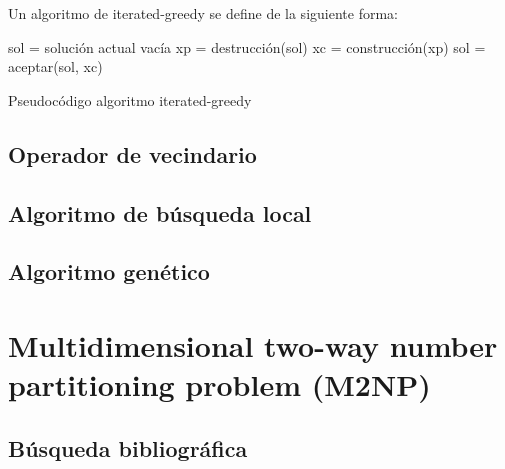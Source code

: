 \documentclass[13pt,a4paper]{article}
\begin{document}
Un algoritmo de iterated-greedy se define de la siguiente forma:

\begin{algorithm}[H]
    \SetAlgoLined
        sol = solución actual vacía \;
         {
            xp = destrucción(sol) \;
            xc = construcción(xp) \;
            sol = aceptar(sol, xc)
        }        
    \caption{Pseudocódigo algoritmo iterated-greedy}
\end{algorithm}




\subsection{Operador de vecindario}

\subsection{Algoritmo de búsqueda local}

\subsection{Algoritmo genético}



\section{Multidimensional two-way number partitioning problem (M2NP)}

\subsection{Búsqueda bibliográfica}

\end{document}
